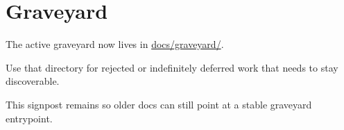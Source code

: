 \chapter{Graveyard}\label{record-419}

\smallskip

The active graveyard now lives in \href{https://github.com/flyingrobots/bijou/blob/cbd70612140e7a450d764b3c7be1c6af878b99bc/docs/graveyard/README.md}{docs/graveyard/}.

Use that directory for rejected or indefinitely deferred work that needs to stay discoverable.

This signpost remains so older docs can still point at a stable graveyard entrypoint.

